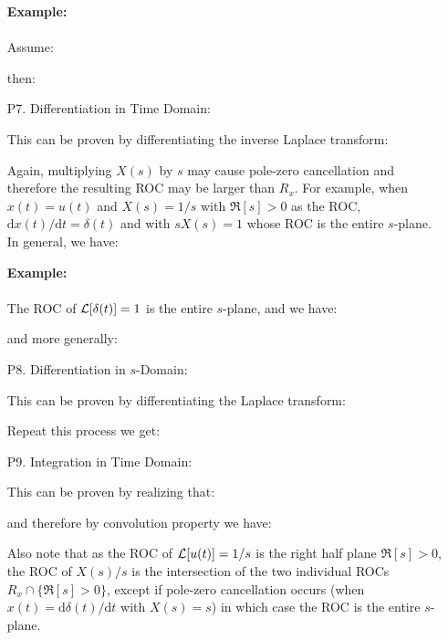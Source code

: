 \begin{enumerate}
		\begin{tcolorbox}[colframe=black,colback=white,sharp corners]
		\textbf{{\Large {}}Example:}\\\\
		Assume:
		
		then:
		
		\end{tcolorbox}
		
		\item[P7.] Differentiation in Time Domain:
		
		This can be proven by differentiating the inverse Laplace transform:
		
		Again, multiplying $X(s)$ by $s$ may cause pole-zero cancellation and therefore the resulting ROC may be larger than $R_x$. For example, when $x(t)=u(t)$ and $X(s)=1/s$ with $\Re[s]>0$ as the ROC, $\mathrm{d} x(t)/\mathrm{d}t=\delta(t)$ and with $sX(s)=1$ whose ROC is the entire $s$-plane. In general, we have:
		
		
		\begin{tcolorbox}[colframe=black,colback=white,sharp corners]
		\textbf{{\Large {}}Example:}\\\\
		The ROC of ${\cal L}[\delta(t)]=1$ is the entire $s$-plane, and we have:
		
		and more generally:
		
		\end{tcolorbox}
		
		\item[P8.] Differentiation in $s$-Domain:
		
		This can be proven by differentiating the Laplace transform:
		
		Repeat this process we get:
		
		
		\item[P9.] Integration in Time Domain:
		
		This can be proven by realizing that:
		
		and therefore by convolution property we have:
		
		Also note that as the ROC of ${\cal L}[u(t)]=1/s$ is the right half plane $\Re[s]>0$, the ROC of $X(s)/s$ is the intersection of the two individual ROCs $R_x \cap \{\Re[s]>0\}$, except if pole-zero cancellation occurs (when $x(t)=\mathrm{d}\delta(t)/\mathrm{d}t$ with $X(s)=s$) in which case the ROC is the entire $s$-plane.
	\end{enumerate}
	
